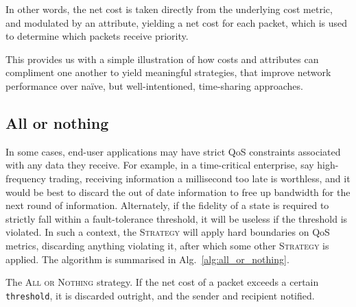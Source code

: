 \documentclass[aps,rmp,twocolumn,amsmath,amssymb,nofootinbib,superscriptaddress,longbibliography,floatfix,table-of-contents,eqsecnum]{revtex4-1}
\begin{document}
In other words, the net cost is taken directly from the underlying cost metric, and modulated by an attribute, yielding a net cost for each packet, which is used to determine which packets receive priority.

This provides us with a simple illustration of how costs and attributes can compliment one another to yield meaningful strategies, that improve network performance over na\"ive, but well-intentioned, time-sharing approaches.

%
%

\subsection{All or nothing} \label{sec:all_or_nothing} 

In some cases, end-user applications may have strict QoS constraints associated with any data they receive. For example, in a time-critical enterprise, say high-frequency trading, receiving information a millisecond too late is worthless, and it would be best to discard the out of date information to free up bandwidth for the next round of information. Alternately, if the fidelity of a state is required to strictly fall within a fault-tolerance threshold, it will be useless if the threshold is violated. In such a context, the \textsc{Strategy} will apply hard boundaries on QoS metrics, discarding anything violating it, after which some other \textsc{Strategy} is applied. The algorithm is summarised in Alg.~\ref{alg:all_or_nothing}.

\begin{table}[!htb]
\caption{The \textsc{All or Nothing} strategy. If the net cost of a packet exceeds a certain \texttt{threshold}, it is discarded outright, and the sender and recipient notified.} \label{alg:all_or_nothing}
\end{table}
\end{document}
